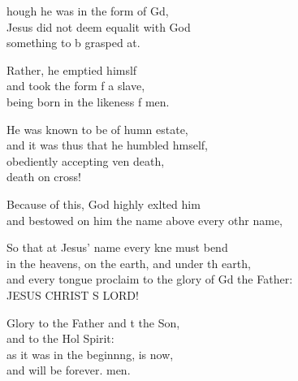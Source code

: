 \settowidth{\versewidth}{and every tongue proclaim to the glory of God the Father: *}
\begin{psalmverse}%
  \begin{patverse}
    hough he was in the form of Gd,\Flex\\
    Jesus did not deem equalit with God\Med\\
    something to b grasped at.
    
    Rather, he emptied himslf\Flex\\
    and took the form f a slave,\Med\\
    being born in the likeness f men.
    
    He was known to be of humn estate,\Med\\
    and it was thus that he humbled h\pointup{\i}mself,\\
    obediently accepting ven death,\Med\\
    death on  cross!
    
    Because of this, God highly exlted him\Med\\
    and bestowed on him the name above every othr name,
    
    So that at Jesus’ name every kne must bend\Med\\
    in the heavens, on the earth, and under th earth,\\
    and every tongue proclaim to the glory of Gd the Father:\Med\\
    JESUS CHRIST S LORD!

    Glory to the Father and t the Son,\Med\\
    and to the Hol Spirit:\\
    as it was in the beginn\pointup{\i}ng, is now,\Med\\
    and will be forever. men.
  \end{patverse}
\end{psalmverse}
